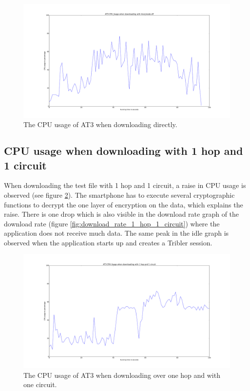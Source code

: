		\begin{figure}[!htb]
			\centering
			\includegraphics[width=\textwidth]{graphics/cpu_usage_anonmode_off.pdf}
			\caption{The CPU usage of AT3 when downloading directly.}
			\label{fig:cpu_anonmode_off}
		\end{figure}
		
	\subsection{CPU usage when downloading with 1 hop and 1 circuit}
		When downloading the test file with 1 hop and 1 circuit, a raise in CPU usage is observed (see figure \ref{fig:cpu_1_hop_1_circuit}). The smartphone has to execute several cryptographic functions to decrypt the one layer of encryption on the data, which explains the raise. There is one drop which is also visible in the download rate graph of the download rate (figure \ref{fig:download_rate_1_hop_1_circuit}) where the application does not receive much data.
		The same peak in the idle graph is observed when the application starts up and creates a Tribler session.
		
		\begin{figure}[!h]
			\centering
			\includegraphics[width=\textwidth]{graphics/cpu_usage_1_hop_1_circuit.pdf}
			\caption{The CPU usage of AT3 when downloading over one hop and with one circuit.}
			\label{fig:cpu_1_hop_1_circuit}
		\end{figure}
			
